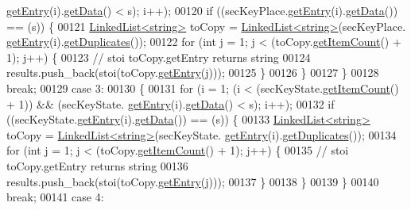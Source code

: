 \begin{DoxyCode}
      \hyperlink{classLinkedList_a341bfd7772c9d24d29eb7a7f3936915b}{getEntry}(i).\hyperlink{classSecKeySS_a9fdb8a771250b7aaab556f019b381eab}{getData}() < s); i++);
00120         \textcolor{keywordflow}{if} ((secKeyPlace.\hyperlink{classLinkedList_a341bfd7772c9d24d29eb7a7f3936915b}{getEntry}(i).\hyperlink{classSecKeySS_a9fdb8a771250b7aaab556f019b381eab}{getData}()) == (s)) \{
00121             \hyperlink{classLinkedList}{LinkedList<string>} toCopy = \hyperlink{classLinkedList}{LinkedList<string>}(secKeyPlace.
      \hyperlink{classLinkedList_a341bfd7772c9d24d29eb7a7f3936915b}{getEntry}(i).\hyperlink{classSecKeySS_abef7c9c03e9bc6b818d599966428fdec}{getDuplicates}());
00122             \textcolor{keywordflow}{for} (\textcolor{keywordtype}{int} j = 1; j < (toCopy.\hyperlink{classLinkedList_afc6635f854f48f2f126cf3b60d845220}{getItemCount}() + 1); j++) \{
00123                 \textcolor{comment}{// stoi toCopy.getEntry returns string}
00124                 results.push\_back(stoi(toCopy.\hyperlink{classLinkedList_a341bfd7772c9d24d29eb7a7f3936915b}{getEntry}(j)));
00125             \}
00126         \}
00127     \}
00128     \textcolor{keywordflow}{break};
00129     \textcolor{keywordflow}{case} 3:
00130     \{
00131         \textcolor{keywordflow}{for} (i = 1; (i < (secKeyState.\hyperlink{classLinkedList_afc6635f854f48f2f126cf3b60d845220}{getItemCount}() + 1)) && (secKeyState.
      \hyperlink{classLinkedList_a341bfd7772c9d24d29eb7a7f3936915b}{getEntry}(i).\hyperlink{classSecKeySS_a9fdb8a771250b7aaab556f019b381eab}{getData}() < s); i++);
00132         \textcolor{keywordflow}{if} ((secKeyState.\hyperlink{classLinkedList_a341bfd7772c9d24d29eb7a7f3936915b}{getEntry}(i).\hyperlink{classSecKeySS_a9fdb8a771250b7aaab556f019b381eab}{getData}()) == (s)) \{
00133             \hyperlink{classLinkedList}{LinkedList<string>} toCopy = \hyperlink{classLinkedList}{LinkedList<string>}(secKeyState.
      \hyperlink{classLinkedList_a341bfd7772c9d24d29eb7a7f3936915b}{getEntry}(i).\hyperlink{classSecKeySS_abef7c9c03e9bc6b818d599966428fdec}{getDuplicates}());
00134             \textcolor{keywordflow}{for} (\textcolor{keywordtype}{int} j = 1; j < (toCopy.\hyperlink{classLinkedList_afc6635f854f48f2f126cf3b60d845220}{getItemCount}() + 1); j++) \{
00135                 \textcolor{comment}{// stoi toCopy.getEntry returns string}
00136                 results.push\_back(stoi(toCopy.\hyperlink{classLinkedList_a341bfd7772c9d24d29eb7a7f3936915b}{getEntry}(j)));
00137             \}
00138         \}
00139     \}
00140     \textcolor{keywordflow}{break};
00141     \textcolor{keywordflow}{case} 4:

\end{DoxyCode}
